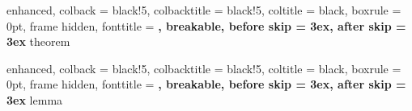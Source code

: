 \usepackage{titlesec}
\usepackage[many]{tcolorbox}

\titlespacing*{\chapter}{0cm}{-2.0cm}{0.50cm}
\titlespacing*{\section}{0cm}{0.50cm}{0.25cm}

\setlength{\parindent}{0pt}
\setlength{\parskip}{1ex}


%
    {enhanced,
    colback = black!5, %
    colbacktitle = black!5,
    coltitle = black,
    boxrule = 0pt,
    frame hidden,
    fonttitle = \bfseries\sffamily,
    breakable,
    before skip = 3ex,
    after skip = 3ex
}{theorem}

%
    {enhanced,
    colback = black!5, %
    colbacktitle = black!5,
    coltitle = black,
    boxrule = 0pt,
    frame hidden,
    fonttitle = \bfseries\sffamily,
    breakable,
    before skip = 3ex,
    after skip = 3ex
}{lemma}


